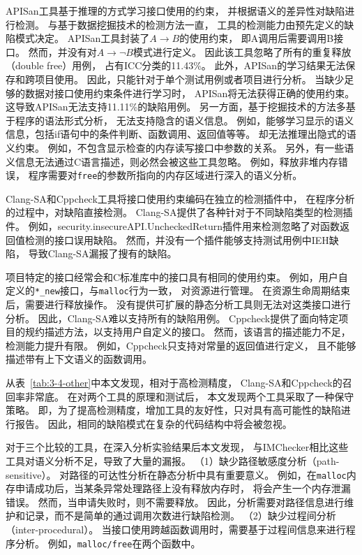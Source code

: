 APISan工具基于推理的方式学习接口使用的约束，
并根据语义的差异性对缺陷进行检测。
与基于数据挖掘技术的检测方法一直，
工具的检测能力由预先定义的缺陷模式决定。
APISan工具封装了$A \rightarrow B$的使用约束，
即A调用后需要调用B接口。
然而，并没有对$A \rightarrow \neg B$模式进行定义。
因此该工具忽略了所有的重复释放（double free）用例，
占有ICC分类的11.43\%。
此外，APISan的学习结果无法保存和跨项目使用。
因此，只能针对于单个测试用例或者项目进行分析。
当缺少足够的数据对接口使用约束条件进行学习时，
APISan将无法获得正确的使用约束。
这导致APISan无法支持11.11\%的缺陷用例。
另一方面，基于挖掘技术的方法多基于程序的语法形式分析，
无法支持隐含的语义信息。
例如，能够学习显示的语义信息，包括if语句中的条件判断、函数调用、返回值等等。
却无法推理出隐式的语义约束。
例如，不包含显示检查的内存读写接口中参数的关系。
另外，有一些语义信息无法通过C语言描述，则必然会被这些工具忽略。
例如，释放非堆内存错误，
程序需要对\texttt{free}的参数所指向的内存区域进行深入的语义分析。

Clang-SA和Cppcheck工具将接口使用约束编码在独立的检测插件中，
在程序分析的过程中，对缺陷直接检测。
Clang-SA提供了各种针对于不同缺陷类型的检测插件。
例如，security.insecureAPI.UncheckedReturn插件用来检测忽略了对函数返回值检测的接口误用缺陷。
然而，并没有一个插件能够支持测试用例中IEH缺陷，
导致Clang-SA漏报了搜有的缺陷。

项目特定的接口经常会和C标准库中的接口具有相同的使用约束。
例如，用户自定义的\texttt{*\_new}接口，与\texttt{malloc}行为一致，
对资源进行管理。
在资源生命周期结束后，需要进行释放操作。
没有提供可扩展的静态分析工具则无法对这类接口进行分析。
因此，Clang-SA难以支持所有的缺陷用例。
Cppcheck提供了面向特定项目的规约描述方法，以支持用户自定义的接口。
然而，该语言的描述能力不足，检测能力提升有限。
例如，Cppcheck只支持对常量的返回值进行定义，
且不能够描述带有上下文语义的函数调用。

从表~\ref{tab:3-4-other}中本文发现，相对于高检测精度，
Clang-SA和Cppcheck的召回率非常底。
在对两个工具的原理和测试后，
本文发现两个工具采取了一种保守策略。
即，为了提高检测精度，增加工具的友好性，只对具有高可能性的缺陷进行报告。
因此，相同的缺陷模式在复杂的代码结构中将会被忽视。

对于三个比较的工具，在深入分析实验结果后本文发现，
与IMChecker相比这些工具对语义分析不足，导致了大量的漏报。
（1）缺少路径敏感度分析（path-sensitive）。
对路径的可达性分析在静态分析中具有重要意义。
例如，在\texttt{malloc}内存申请成功后，当某条异常处理路径上没有释放内存时，
将会产生一个内存泄漏错误。
然而，当申请失败时，则不需要释放。
因此，分析需要对路径信息进行维护和记录，而不是简单的通过调用次数进行缺陷检测。
（2）缺少过程间分析（inter-procedural）。
当接口使用跨越函数调用时，需要基于过程间信息来进行程序分析。
例如，\texttt{malloc/free}在两个函数中。


